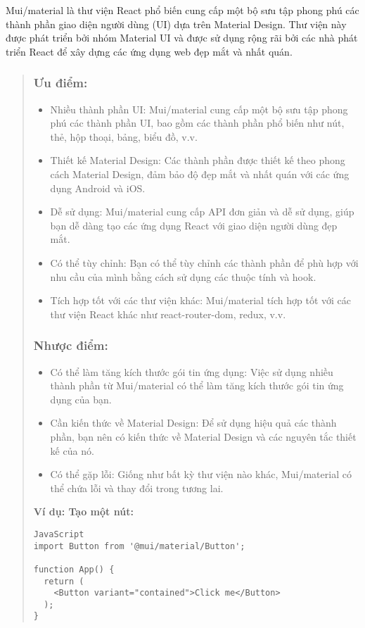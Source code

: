 Mui/material là thư viện React phổ biến cung cấp một bộ sưu tập phong phú các thành phần giao diện người dùng (UI) dựa trên Material Design. Thư viện này được phát triển bởi nhóm Material UI và được sử dụng rộng rãi bởi các nhà phát triển React để xây dựng các ứng dụng web đẹp mắt và nhất quán.
\begin{quote}
\subsubsection{Ưu điểm:}
\begin{itemize}
\item Nhiều thành phần UI: Mui/material cung cấp một bộ sưu tập phong phú các thành phần UI, bao gồm các thành phần phổ biến như nút, thẻ, hộp thoại, bảng, biểu đồ, v.v.
\item Thiết kế Material Design: Các thành phần được thiết kế theo phong cách Material Design, đảm bảo độ đẹp mắt và nhất quán với các ứng dụng Android và iOS.
\item Dễ sử dụng: Mui/material cung cấp API đơn giản và dễ sử dụng, giúp bạn dễ dàng tạo các ứng dụng React với giao diện người dùng đẹp mắt.
\item Có thể tùy chỉnh: Bạn có thể tùy chỉnh các thành phần để phù hợp với nhu cầu của mình bằng cách sử dụng các thuộc tính và hook.
\item Tích hợp tốt với các thư viện khác: Mui/material tích hợp tốt với các thư viện React khác như react-router-dom, redux, v.v.
\end{itemize}

\subsubsection{Nhược điểm:}
\begin{itemize}
\item Có thể làm tăng kích thước gói tin ứng dụng: Việc sử dụng nhiều thành phần từ Mui/material có thể làm tăng kích thước gói tin ứng dụng của bạn.
\item Cần kiến thức về Material Design: Để sử dụng hiệu quả các thành phần, bạn nên có kiến thức về Material Design và các nguyên tắc thiết kế của nó.
\item Có thể gặp lỗi: Giống như bất kỳ thư viện nào khác, Mui/material có thể chứa lỗi và thay đổi trong tương lai.
 \end{itemize}
 \textbf{Ví dụ: Tạo một nút:}
\begin{lstlisting}
JavaScript
import Button from '@mui/material/Button';

function App() {
  return (
    <Button variant="contained">Click me</Button>
  );
}
\end{lstlisting}

\end{quote}
